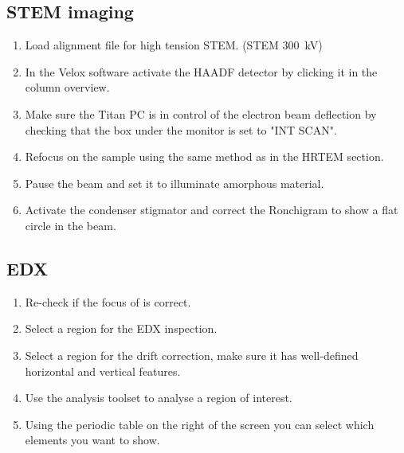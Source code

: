 \documentclass[a4paper]{scrartcl}
\begin{document}
\subsection*{STEM imaging}
\begin{enumerate}
	\item Load alignment file for high tension STEM. (STEM \SI{300}{\kilo \volt})
	\item In the Velox software activate the HAADF detector by clicking it in the column overview.
	\item Make sure the Titan PC is in control of the electron beam deflection by checking that the box under the monitor is set to "INT SCAN".
	\item Refocus on the sample using the same method as in the HRTEM section.
	\item Pause the beam and set it to illuminate amorphous material.
	\item Activate the condenser stigmator and correct the Ronchigram to show a flat circle in the beam.
\end{enumerate}

\subsection*{EDX}
\begin{enumerate}
	\item Re-check if the focus of is correct.
	\item Select a region for the EDX inspection.
	\item Select a region for the drift correction, make sure it has well-defined horizontal and vertical features.
	\item Use the analysis toolset to analyse a region of interest.
	\item Using the periodic table on the right of the screen you can select which elements you want to show.
\end{enumerate}
\end{document}
